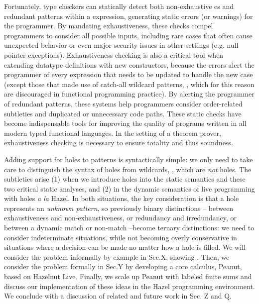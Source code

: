 Fortunately,
type checkers can statically detect both non-exhaustive es and redundant patterns within a  expression, generating static errors (or warnings) for the programmer. 
By mandating exhaustiveness, these checks compel programmers to consider all possible inputs, including rare cases that often cause unexpected behavior or even major security issues in other settings (e.g. null pointer exceptions). Exhaustiveness checking is also a critical tool when extending datatype definitions with new constructors, because the errors 
alert the programmer of every  expression that needs to be updated to handle the new case (except those that made use of catch-all wildcard patterns, \li{_}, which for this reason are discouraged in functional programming practice).
By alerting the programmer of redundant patterns, these systems help programmers consider order-related subtleties and duplicated or unnecessary code paths. These static checks have become indispensable tools for improving the quality of programs written in all modern typed functional languages. In the setting of a theorem prover, exhaustiveness checking is necessary to ensure totality and thus soundness.  

Adding support for holes to patterns is syntactically simple: we only need to take care to distinguish the syntax of holes from wildcards, \li{_}, which are \emph{not} holes. The subtleties arise (1) when we introduce holes into the static semantics and these two critical static analyses, and (2) in the dynamic semantics of live programming with holes \emph{a la} Hazel. In both situations, the key consideration is that a hole represents an \emph{unknown pattern}, so previously binary distinctions -- between exhaustiveness and non-exhaustiveness, or redundancy and irredundancy, or between a dynamic match or non-match --become ternary distinctions: we need to consider indeterminate situations, while not becoming overly conservative in situations where a decision can be made no matter how a hole is filled. We will consider the problem informally by example in Sec.X, showing . Then, we consider the problem formally in Sec.Y by developing a core calculus, Peanut, based on Hazelnut Live. Finally, we scale up Peanut with labeled finite sums and discuss our implementation of these ideas in the Hazel programming environment. We conclude with a discussion of related and future work in Sec. Z and Q.


